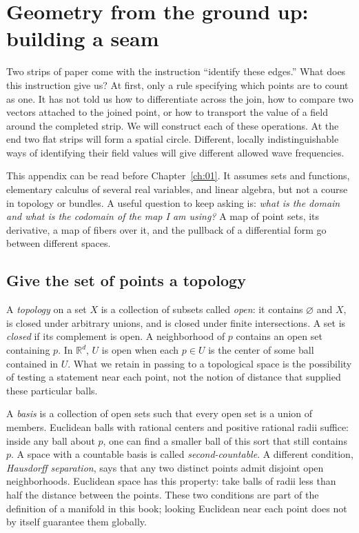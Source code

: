 \chapter{Geometry from the ground up: building a seam}\label{app:D}
Two strips of paper come with the instruction ``identify these edges.'' What does this instruction give us? At first, only a rule specifying which points are to count as one. It has not told us how to differentiate across the join, how to compare two vectors attached to the joined point, or how to transport the value of a field around the completed strip. We will construct each of these operations. At the end two flat strips will form a spatial circle. Different, locally indistinguishable ways of identifying their field values will give different allowed wave frequencies.

This appendix can be read before Chapter~\ref{ch:01}. It assumes sets and functions, elementary calculus of several real variables, and linear algebra, but not a course in topology or bundles. A useful question to keep asking is: \emph{what is the domain and what is the codomain of the map I am using?} A map of point sets, its derivative, a map of fibers over it, and the pullback of a differential form go between different spaces.

\section{Give the set of points a topology}\label{D-topology}

A \emph{topology} on a set $X$ is a collection of subsets called \emph{open}: it contains $\varnothing$ and $X$, is closed under arbitrary unions, and is closed under finite intersections. A set is \emph{closed} if its complement is open. A neighborhood of $p$ contains an open set containing $p$. In $\mathbb R^d$, $U$ is open when each $p\in U$ is the center of some ball contained in $U$. What we retain in passing to a topological space is the possibility of testing a statement near each point, not the notion of distance that supplied these particular balls.

A \emph{basis} is a collection of open sets such that every open set is a union of members. Euclidean balls with rational centers and positive rational radii suffice: inside any ball about $p$, one can find a smaller ball of this sort that still contains $p$. A space with a countable basis is called \emph{second-countable}. A different condition, \emph{Hausdorff separation}, says that any two distinct points admit disjoint open neighborhoods. Euclidean space has this property: take balls of radii less than half the distance between the points. These two conditions are part of the definition of a manifold in this book; looking Euclidean near each point does not by itself guarantee them globally.

